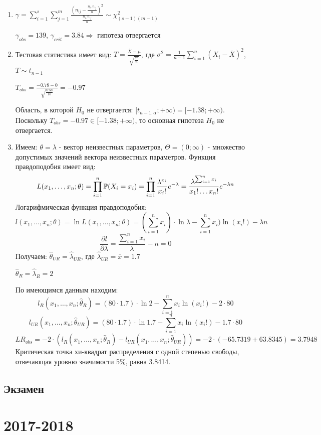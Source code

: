 \documentclass[12pt, a4paper]{article}\usepackage[]{graphicx}\usepackage[]{color}
\begin{document}
\begin{enumerate}
\item $\gamma = \sum_{i=1}^s \sum_{j=1}^m \frac{\left(n_{ij} - \frac{n_{i\cdot}n_{\cdot j}}{n}\right)^2}{\frac{n_{i\cdot}n_{\cdot j}}{n}} \sim \chi^2_{(s-1)(m-1)}$

$\gamma_{obs} = 139$, $\gamma_{crit} = 3.84 \Rightarrow$ гипотеза отвергается
\item Тестовая статистика имеет вид: $T = \frac{\overline{X}-\mu}{\sqrt{\frac{\sigma^2}{n}}}$, где $\sigma^2 = \frac{1}{n-1} \sum_{i=1}^{n}(X_i - \overline{X})^2$, $T \sim t_{n-1}$

$T_{obs} = \frac{-0.78-0}{\sqrt{\frac{6.53}{10}}} = -0.97$

Область, в которой $H_0$ не отвергается: $[t_{n-1, \alpha}; +\infty) = [-1.38; +\infty)$. Поскольку $T_{obs} = -0.97 \in [-1.38; +\infty)$,
то основная гипотеза $H_0$ не отвергается.
\item Имеем: $\theta = \lambda$ - вектор неизвестных параметров, $\Theta = (0; \infty)$ - множество допустимых значений вектора неизвестных параметров.
Функция правдоподобия имеет вид:
\[
L(x_1, \ldots, x_n; \theta) = \prod_{i=1}^n \P(X_i = x_i) = \prod_{i=1}^n \frac{\lambda^{x_i}}{x_i !} e^{-\lambda} = \frac{\lambda^{\sum_{i=1}^{n} x_i}}{x_1 ! \ldots x_n !} e^{-\lambda n}
\]
Логарифмическая функция правдоподобия:
\[
l(x_1, \ldots, x_n; \theta) = \ln L(x_1, \ldots, x_n; \theta) = (\sum_{i=1}^n x_i) \cdot \ln \lambda - \sum_{i=1}^n x_i) \ln (x_i !) - \lambda n
\]
\[
\frac{\partial l}{\partial \lambda} = \frac{\sum_{i=1}^n x_i}{\lambda} - n = 0
\]
Получаем: $\hat{\theta}_{UR} = \hat{\lambda}_{UR}$, где $\hat{\lambda}_{UR} = \overline{x} = 1.7 $

$\hat{\theta}_{R} = \hat{\lambda}_{R} = 2$

По имеющимся данным находим:
\[
l_{R} (x_1, \ldots, x_n; \hat{\theta}_{R}) = (80 \cdot 1.7)  \cdot \ln 2 - \sum_{i=1}^n x_i \ln (x_i !) - 2 \cdot 80
\]
\[
l_{UR} (x_1, \ldots, x_n; \hat{\theta}_{UR}) = (80 \cdot 1.7)  \cdot \ln 1.7 - \sum_{i=1}^n x_i \ln (x_i !) - 1.7 \cdot 80
\]
\[
LR_{obs} = -2\cdot(l_{R} (x_1, \ldots, x_n; \hat{\theta}_{R})- l_{UR} (x_1, \ldots, x_n; \hat{\theta}_{UR})) = -2 \cdot (-65.7319 + 63.8345) = 3.7948
\]
Критическая точка хи-квадрат распределения с одной степенью свободы, отвечающая уровню значимости 5\%, равна 3.8414.
\end{enumerate}


\subsection{Экзамен}



\section{2017-2018}
\end{document}
